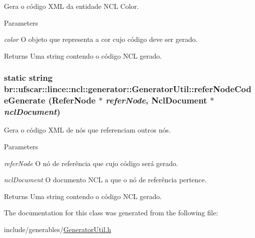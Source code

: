 Gera o código XML da entidade NCL Color. 


\begin{DoxyParams}{Parameters}
\item[{\em color}]O objeto que representa a cor cujo código deve ser gerado. \end{DoxyParams}
\begin{DoxyReturn}{Returns}
Uma string contendo o código NCL gerado. 
\end{DoxyReturn}
\hypertarget{classbr_1_1ufscar_1_1lince_1_1ncl_1_1generator_1_1GeneratorUtil_a7e02b3e55b58c419f56c86fa4d431265}{
\subsubsection[{referNodeCodeGenerate}]{\setlength{\rightskip}{0pt plus 5cm}static string br::ufscar::lince::ncl::generator::GeneratorUtil::referNodeCodeGenerate (ReferNode $\ast$ {\em referNode}, \/  NclDocument $\ast$ {\em nclDocument})}}
\label{classbr_1_1ufscar_1_1lince_1_1ncl_1_1generator_1_1GeneratorUtil_a7e02b3e55b58c419f56c86fa4d431265}


Gera o código XML de nós que referenciam outros nós. 


\begin{DoxyParams}{Parameters}
\item[{\em referNode}]O nó de referência que cujo código será gerado. \item[{\em nclDocument}]O documento NCL a que o nó de referência pertence. \end{DoxyParams}
\begin{DoxyReturn}{Returns}
Uma string contendo o código NCL gerado. 
\end{DoxyReturn}


The documentation for this class was generated from the following file:\begin{DoxyCompactItemize}
\item 
include/generables/\hyperlink{GeneratorUtil_8h}{GeneratorUtil.h}\end{DoxyCompactItemize}
